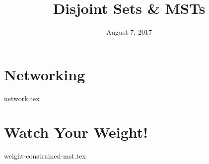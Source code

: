 \documentclass{exam}
\title{Disjoint Sets \& MSTs}
\date{August 7, 2017}
\begin{document}
\maketitle

\section{Networking}
\begin{questions}
{network.tex}
\end{questions}

\section{Watch Your Weight!}
\begin{questions}
{weight-constrained-mst.tex}
\end{questions}
\end{document}
